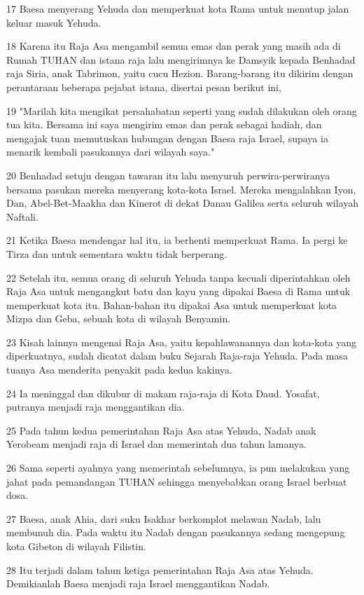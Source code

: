 \par 17 Baesa menyerang Yehuda dan memperkuat kota Rama untuk menutup jalan keluar masuk Yehuda.
\par 18 Karena itu Raja Asa mengambil semua emas dan perak yang masih ada di Rumah TUHAN dan istana raja lalu mengirimnya ke Damsyik kepada Benhadad raja Siria, anak Tabrimon, yaitu cucu Hezion. Barang-barang itu dikirim dengan perantaraan beberapa pejabat istana, disertai pesan berikut ini,
\par 19 "Marilah kita mengikat persahabatan seperti yang sudah dilakukan oleh orang tua kita. Bersama ini saya mengirim emas dan perak sebagai hadiah, dan mengajak tuan memutuskan hubungan dengan Baesa raja Israel, supaya ia menarik kembali pasukannya dari wilayah saya."
\par 20 Benhadad setuju dengan tawaran itu lalu menyuruh perwira-perwiranya bersama pasukan mereka menyerang kota-kota Israel. Mereka mengalahkan Iyon, Dan, Abel-Bet-Maakha dan Kinerot di dekat Danau Galilea serta seluruh wilayah Naftali.
\par 21 Ketika Baesa mendengar hal itu, ia berhenti memperkuat Rama. Ia pergi ke Tirza dan untuk sementara waktu tidak berperang.
\par 22 Setelah itu, semua orang di seluruh Yehuda tanpa kecuali diperintahkan oleh Raja Asa untuk mengangkut batu dan kayu yang dipakai Baesa di Rama untuk memperkuat kota itu. Bahan-bahan itu dipakai Asa untuk memperkuat kota Mizpa dan Geba, sebuah kota di wilayah Benyamin.
\par 23 Kisah lainnya mengenai Raja Asa, yaitu kepahlawanannya dan kota-kota yang diperkuatnya, sudah dicatat dalam buku Sejarah Raja-raja Yehuda. Pada masa tuanya Asa menderita penyakit pada kedua kakinya.
\par 24 Ia meninggal dan dikubur di makam raja-raja di Kota Daud. Yosafat, putranya menjadi raja menggantikan dia.
\par 25 Pada tahun kedua pemerintahan Raja Asa atas Yehuda, Nadab anak Yerobeam menjadi raja di Israel dan memerintah dua tahun lamanya.
\par 26 Sama seperti ayahnya yang memerintah sebelumnya, ia pun melakukan yang jahat pada pemandangan TUHAN sehingga menyebabkan orang Israel berbuat dosa.
\par 27 Baesa, anak Ahia, dari suku Isakhar berkomplot melawan Nadab, lalu membunuh dia. Pada waktu itu Nadab dengan pasukannya sedang mengepung kota Gibeton di wilayah Filistin.
\par 28 Itu terjadi dalam tahun ketiga pemerintahan Raja Asa atas Yehuda. Demikianlah Baesa menjadi raja Israel menggantikan Nadab.
